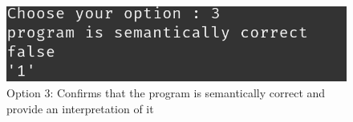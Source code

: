 \begin{itemize}
	      \begin{figure}[H]
	      	\centering
	      	\includegraphics[scale=0.9]{Introduction/images/option3menu.png}
	      	\caption{Option 3: Confirms that the program is semantically correct and provide an interpretation of it}
	      	\label{fig:option-three-interpreter}
	      \end{figure}
	      	      
\end{itemize}




